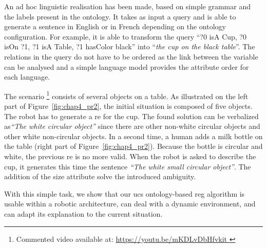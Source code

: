 An ad hoc linguistic realisation has been made, based on simple grammar and the labels present in the ontology. It takes as input a \sparql{} query and is able to generate a sentence in English or in French depending on the ontology configuration. For example, it is able to transform the query ``?0 isA Cup, ?0 isOn ?1, ?1 isA Table, ?1 hasColor black'' into ``\textit{the cup on the black table}''. The relations in the query do not have to be ordered as the link between the variable can be analysed and a simple language model provides the attribute order for each language.

The scenario \footnote{Commented video available at: \url{https://youtu.be/mKDLvDbHfvkit }} consists of several objects on a table. As illustrated on the left part of Figure~\ref{fig:chap4_pr2}, the initial situation is composed of five objects. The robot has to generate a \acrshort{re} for the cup. The found solution can be verbalized as\textit{``The white circular object''} since there are other non-white circular objects and other white non-circular objects. In a second time, a human adds a milk bottle on the table (right part of Figure~\ref{fig:chap4_pr2}). Because the bottle is circular and white, the previous \acrshort{re} is no more valid. When the robot is asked to describe the cup, it generates this time the sentence \textit{``The white small circular object''}. The addition of the size attribute solve the introduced ambiguity.

With this simple task, we show that our \acrshort{ucs} ontology-based \acrshort{reg} algorithm is usable within a robotic architecture, can deal with a dynamic environment, and can adapt its explanation to the current situation.
